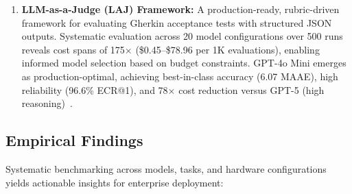 \begin{enumerate}[leftmargin=*]
    \item \textbf{LLM-as-a-Judge (LAJ) Framework:} A production-ready, rubric-driven framework for evaluating Gherkin acceptance tests with structured JSON outputs. Systematic evaluation across 20 model configurations over 500 runs reveals cost spans of 175$\times$ (\$0.45--\$78.96 per 1K evaluations), enabling informed model selection based on budget constraints. GPT-4o Mini emerges as production-optimal, achieving best-in-class accuracy (6.07 MAAE), high reliability (96.6\% ECR@1), and 78$\times$ cost reduction versus GPT-5 (high reasoning)~\cite{huang2026judge}.

\end{enumerate}

\subsection{Empirical Findings}

Systematic benchmarking across models, tasks, and hardware configurations yields actionable insights for enterprise deployment:

